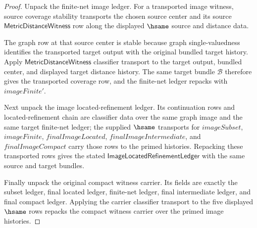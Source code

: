 \begin{proof}
Unpack the finite-net image ledger. For a transported image witness, source
coverage stability transports the chosen source center and its source
$\mathsf{MetricDistanceWitness}$ row along the displayed $\hsame$ source and
distance data.

The graph row at that source center is stable because graph single-valuedness
identifies the transported target output with the original bundled target
history. Apply $\mathsf{MetricDistanceWitness}$ classifier transport to the
target output, bundled center, and displayed target distance history. The same
target bundle $\mathcal{B}$ therefore gives the transported coverage row, and
the finite-net ledger repacks with $imageFinite'$.

Next unpack the image located-refinement ledger. Its continuation rows and
located-refinement chain are classifier data over the same graph image and the
same target finite-net ledger; the supplied $\hsame$ transports for
$imageSubset$, $imageFinite$, $finalImageLocated$, $finalImageIntermediate$, and
$finalImageCompact$ carry those rows to the primed histories. Repacking these
transported rows gives the stated
$\mathsf{ImageLocatedRefinementLedger}$ with the same source and target bundles.

Finally unpack the original compact witness carrier. Its fields are exactly the
subset ledger, final located ledger, finite-net ledger, final intermediate
ledger, and final compact ledger. Applying the carrier classifier transport to
the five displayed $\hsame$ rows repacks the compact witness carrier over the
primed image histories.
\end{proof}

